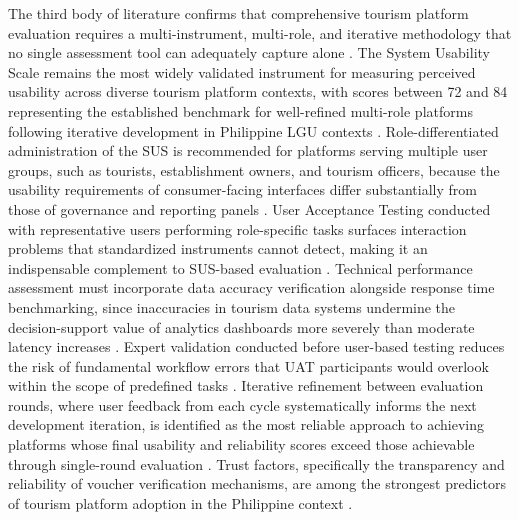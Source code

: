 \documentclass{research}
\begin{document}
The third body of literature confirms that comprehensive tourism platform
evaluation requires a multi-instrument, multi-role, and iterative
methodology that no single assessment tool can adequately capture alone
\cite{gretzel2023, delvecchio2022}. The System Usability Scale remains
the most widely validated instrument for measuring perceived usability
across diverse tourism platform contexts, with scores between 72 and 84
representing the established benchmark for well-refined multi-role
platforms following iterative development in Philippine LGU contexts
\cite{ramos2024, mendoza2024}. Role-differentiated administration of
the SUS is recommended for platforms serving multiple user groups,
such as tourists, establishment owners, and tourism officers, because the
usability requirements of consumer-facing interfaces differ substantially
from those of governance and reporting panels \cite{gretzel2023,
satzinger2021}. User Acceptance Testing conducted with representative
users performing role-specific tasks surfaces interaction problems that
standardized instruments cannot detect, making it an indispensable
complement to SUS-based evaluation \cite{utauttourism2023}. Technical
performance assessment must incorporate data accuracy verification
alongside response time benchmarking, since inaccuracies in tourism data
systems undermine the decision-support value of analytics dashboards
more severely than moderate latency increases \cite{delvecchio2022,
mariani2022, xiang2022, iso25010}. Expert validation conducted before
user-based testing reduces the risk of fundamental workflow errors that
UAT participants would overlook within the scope of predefined tasks
\cite{sommerville2021, koo2021}. Iterative refinement between evaluation
rounds, where user feedback from each cycle systematically informs
the next development iteration, is identified as the most reliable
approach to achieving platforms whose final usability and reliability
scores exceed those achievable through single-round evaluation
\cite{chung2022, mahmud2022, martin2023, du2021}. Trust factors,
specifically the transparency and reliability of voucher verification
mechanisms, are among the strongest predictors of tourism platform
adoption in the Philippine context \cite{jeong2023, balinas2024}.
\end{document}
